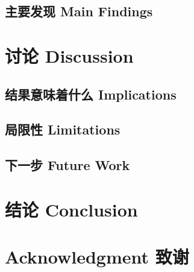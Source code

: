 \documentclass[conference]{IEEEtran}
\begin{document}
\subsection{主要发现 Main Findings}

\section{讨论 Discussion}
\subsection{结果意味着什么 Implications}

\subsection{局限性 Limitations}

\subsection{下一步 Future Work}

\section{结论 Conclusion}

\section*{Acknowledgment 致谢}


\end{document}

